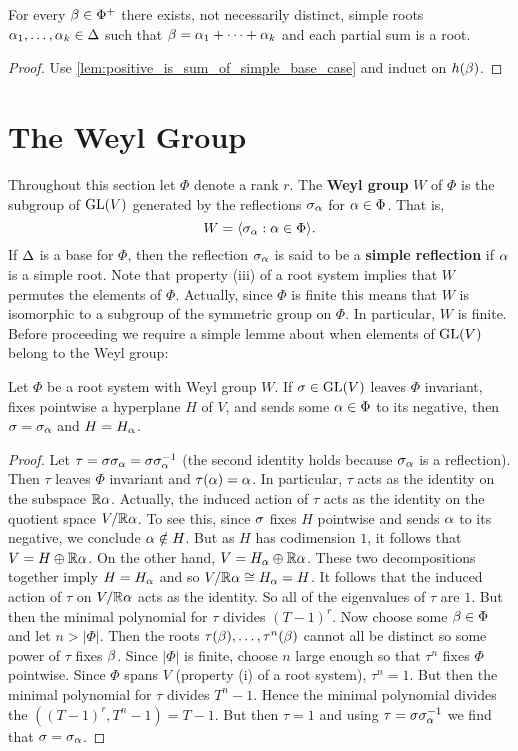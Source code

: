\documentclass[12pt,reqno,oneside]{amsart}
\begin{document}
    \begin{corollary}
        For every $\beta \in \Phi^{+}$ there exists, not necessarily distinct, simple roots $\alpha_{1},\ldots,\alpha_{k} \in \Delta$ such that $\beta = \alpha_{1}+\cdots+\alpha_{k}$ and each partial sum is a root.
    \end{corollary}
    \begin{proof}
        Use \cref{lem:positive_is_sum_of_simple_base_case} and induct on $h(\beta)$. 
    \end{proof}
\section{The Weyl Group}
    Throughout this section let $\Phi$ denote a rank $r$. The \textbf{Weyl group} $W$ of $\Phi$ is the subgroup of $\mathrm{GL}(V)$ generated by the reflections $\sigma_{\alpha}$ for $\alpha \in \Phi$. That is,
    \[
        W = \langle\sigma_{\alpha}:\alpha \in \Phi\rangle.
    \]
    If $\Delta$ is a base for $\Phi$, then the reflection $\sigma_{\alpha}$ is said to be a \textbf{simple reflection} if $\alpha$ is a simple root. Note that property (iii) of a root system implies that $W$ permutes the elements of $\Phi$. Actually, since $\Phi$ is finite this means that $W$ is isomorphic to a subgroup of the symmetric group on $\Phi$. In particular, $W$ is finite. Before proceeding we require a simple lemme about when elements of $\mathrm{GL}(V)$ belong to the Weyl group:

    \begin{lemma}\label{lem:when_linear_transform_is_a_Weyl_group_element}
        Let $\Phi$ be a root system with Weyl group $W$. If $\sigma \in \mathrm{GL}(V)$ leaves $\Phi$ invariant, fixes pointwise a hyperplane $H$ of $V$, and sends some $\alpha \in \Phi$ to its negative, then $\sigma = \sigma_{\alpha}$ and $H = H_{\alpha}$. 
    \end{lemma}
    \begin{proof}
        Let $\tau = \sigma\sigma_{\alpha} = \sigma\sigma_{\alpha}^{-1}$ (the second identity holds because $\sigma_{\alpha}$ is a reflection). Then $\tau$ leaves $\Phi$ invariant and $\tau(\alpha) = \alpha$. In particular, $\tau$ acts as the identity on the subspace $\mathbb{R}\alpha$. Actually, the induced action of $\tau$ acts as the identity on the quotient space $V/\mathbb{R}\alpha$. To see this, since $\sigma$ fixes $H$ pointwise and sends $\alpha$ to its negative, we conclude $\alpha \notin H$. But as $H$ has codimension $1$, it follows that $V = H \oplus \mathbb{R}\alpha$. On the other hand, $V = H_{\alpha} \oplus \mathbb{R}\alpha$. These two decompositions together imply $H = H_{\alpha}$ and so $V/\mathbb{R}\alpha \cong H_{\alpha} = H$. It follows that the induced action of $\tau$ on $V/\mathbb{R}\alpha$ acts as the identity. So all of the eigenvalues of $\tau$ are $1$. But then the minimal polynomial for $\tau$ divides $(T-1)^{r}$. Now choose some $\beta \in \Phi$ and let $n > |\Phi|$. Then the roots $\tau(\beta),\ldots,\tau^{n}(\beta)$ cannot all be distinct so some power of $\tau$ fixes $\beta$. Since $|\Phi|$ is finite, choose $n$ large enough so that $\tau^{n}$ fixes $\Phi$ pointwise. Since $\Phi$ spans $V$ (property (i) of a root system), $\tau^{n} = 1$. But then the minimal polynomial for $\tau$ divides $T^{n}-1$. Hence the minimal polynomial divides the $((T-1)^{r},T^{n}-1) = T-1$. But then $\tau = 1$ and using $\tau = \sigma\sigma_{\alpha}^{-1}$ we find that $\sigma = \sigma_{\alpha}$.
    \end{proof}
\end{document}

